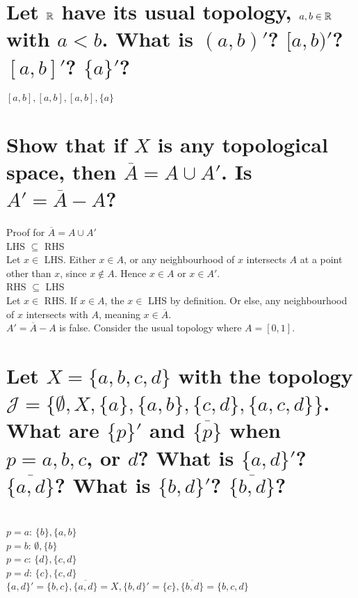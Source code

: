 \begin{parts}
 \part{Let $\mathbb{R}$ have its usual topology, $a, b \in \mathbb{R}$ with $a < b$. What is $(a, b)'$? $[a, b)'$? $[a, b]'$? $\{a\}'$?}
 
\begin{solution}
 $[a,b], [a,b], [a,b], \{a\}$
\end{solution}

\part{Show that if $X$ is any topological space, then $\overline{A} = A \cup A'$. Is $A' = \overline{A} - A$?}

\begin{solution}
 Proof for $\overline{A} = A \cup A'$ \\
 LHS $\subseteq$ RHS \\
 Let $x \in$ LHS. Either $x \in A$, or any neighbourhood of $x$ intersects $A$ at a point other than $x$, since $x \notin A$. Hence $x \in A$ or $x \in A'$. \\
 RHS $\subseteq$ LHS \\
 Let $x \in$ RHS. If $x \in A$, the $x \in$ LHS by definition. Or else, any neighbourhood of $x$ intersects with $A$, meaning $x \in \overline{A}$. \\
 $A' = \overline{A} - A$ is false. Consider the usual topology where $A = [0,1]$.
\end{solution}

\part{Let $X = \{a, b, c, d\}$ with the topology $\mathcal{J} = \{\emptyset, X, \{a\}, \{a,b\}, \{c, d\}, \{a, c, d\}\}$. What are $\{p\}'$ and $\overline{\{p\}}$ when $p = a,b,c$, or $d$? What is $\{a,d\}'$? $\overline{\{a,d\}}$? What is $\{b,d\}'$? $\overline{\{b,d\}}$?}

\begin{solution}
 \\$p = a$: $\{b\}, \{a, b\}$ \\
 $p = b$: $\emptyset, \{b\}$ \\
 $p = c$: $\{d\}, \{c,d\}$ \\
 $p = d$: $\{c\}, \{c,d\}$ \\
 $\{a,d\}' = \{b, c\}, \overline{\{a,d\}} = X, \{b,d\}' = \{c\}, \overline{\{b,d\}} = \{b,c,d\}$
\end{solution}
\end{parts}

